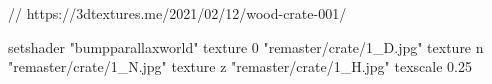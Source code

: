 // https://3dtextures.me/2021/02/12/wood-crate-001/

setshader "bumpparallaxworld"
    texture 0 "remaster/crate/1_D.jpg"
    texture n "remaster/crate/1_N.jpg"
    texture z "remaster/crate/1_H.jpg"
    texscale 0.25